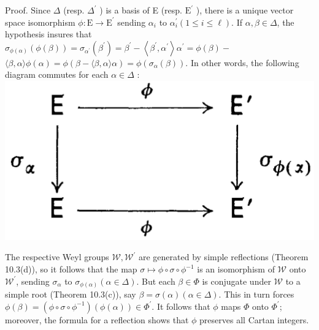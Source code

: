 \documentclass[10pt]{article}
\begin{document}
Proof. Since $\Delta$ (resp. $\Delta^{\prime}$ ) is a basis of E (resp. $\mathrm{E}^{\prime}$ ), there is a unique vector space isomorphism $\phi: \mathrm{E} \rightarrow \mathrm{E}^{\prime}$ sending $\alpha_{i}$ to $\alpha_{i}^{\prime}(1 \leq i \leq \ell)$. If $\alpha, \beta \in \Delta$, the hypothesis insures that $\sigma_{\phi(\alpha)}(\phi(\beta))=\sigma_{\alpha^{\prime}}\left(\beta^{\prime}\right)=\beta^{\prime}-\left\langle\beta^{\prime}, \alpha^{\prime}\right\rangle \alpha^{\prime}=\phi(\beta)-$\\
$\langle\beta, \alpha\rangle \phi(\alpha)=\phi(\beta-\langle\beta, \alpha\rangle \alpha)=\phi\left(\sigma_{\alpha}(\beta)\right)$. In other words, the following diagram commutes for each $\alpha \in \Delta$ :\\
\includegraphics[max width=\textwidth, center]{2025_06_06_fac2836a92464059da43g-069}

The respective Weyl groups $\mathscr{W}, \mathscr{W}^{\prime}$ are generated by simple reflections (Theorem 10.3(d)), so it follows that the map $\sigma \mapsto \phi \circ \sigma \circ \phi^{-1}$ is an isomorphism of $\mathscr{W}$ onto $\mathscr{W}^{\prime}$, sending $\sigma_{\alpha}$ to $\sigma_{\phi(\alpha)}(\alpha \in \Delta)$. But each $\beta \in \Phi$ is conjugate under $\mathscr{W}$ to a simple root (Theorem 10.3(c)), say $\beta=\sigma(\alpha)(\alpha \in \Delta)$. This in turn forces $\phi(\beta)=\left(\phi \circ \sigma \circ \phi^{-1}\right)(\phi(\alpha)) \in \Phi^{\prime}$. It follows that $\phi$ maps $\Phi$ onto $\Phi^{\prime}$; moreover, the formula for a reflection shows that $\phi$ preserves all Cartan integers.
\end{document}
